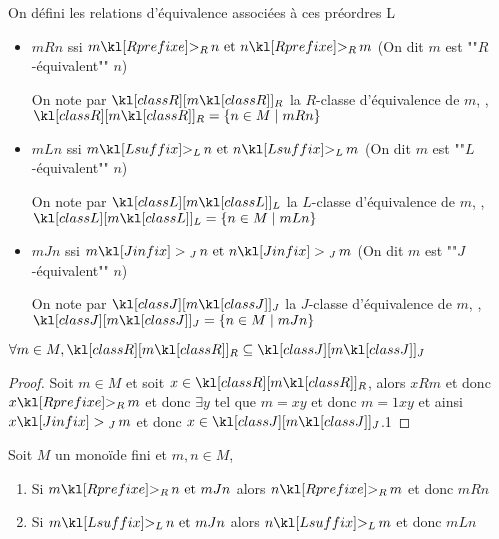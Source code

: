 \begin{notation}
	On défini les relations d'équivalence associées à ces préordres L
	\begin{itemize}
		\item $m R n$ ssi $m \geqr n \et n \geqr m$ (On dit $m$ est ""$R$-équivalent""  $n$)

		      On note par $\classr m$ la $R$-classe d'équivalence de $m$, \ie, $\classr m =
			      \setdef {n \in M} {m R n}$

		\item $m L n$ ssi $m \geql n \et n \geql m$ (On dit $m$ est ""$L$-équivalent""  $n$)

		      On note par $\classl m$ la $L$-classe d'équivalence de $m$, \ie, $\classl m =
			      \setdef {n \in M} {m L n}$

		\item $m J n$ ssi $m \geqj n \et n \geqj m$ (On dit $m$ est ""$J$-équivalent""  $n$)

		      On note par $\classj m$ la $J$-classe d'équivalence de $m$, \ie, $\classj m =
			      \setdef {n \in M} {m J n}$
	\end{itemize}
\end{notation}

\begin{exercice}
	$\forall m \in M, \classr m \subseteq \classj m$
\end{exercice}

\begin{proof}
	Soit $m \in M$ et soit $x \in \classr m$, alors $x R m$ et donc
	$ x \geqr m$ et donc $\exists y $ tel que $m = xy$ et donc $m = 1xy$ et ainsi
	$x \geqj m$ et donc $x \in \classj m$.1
\end{proof}

\begin{lemma}
	Soit $M$ un monoïde fini et $m,n \in M$,

	\begin{enumerate}
		\item Si $m \geqr n \et m J n$ alors $n \geqr m$ et donc $m R n$
		\item Si $m \geql n \et m J n$ alors $n \geql m$ et donc $m L n$
	\end{enumerate}
\end{lemma}

